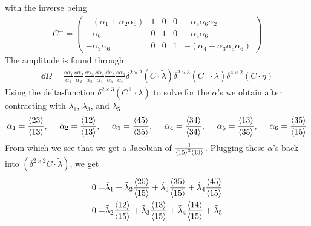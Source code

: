 \documentclass[letter,11pt]{article}
\begin{document}
with the inverse being
\begin{equation}
	\begin{aligned}
		C^\perp =\begin{pmatrix}
			-(\alpha_1+\alpha_2\alpha_6) & 1 & 0 & 0 & -\alpha_5 \alpha_6 \alpha_2\\
			-\alpha_6 & 0 & 1 & 0 & -\alpha_5 \alpha_6 \\
			-\alpha_3 \alpha_6 & 0 & 0 & 1 & -(\alpha_4+\alpha_3\alpha_5\alpha_6)
		\end{pmatrix}
	\end{aligned}
\end{equation}
The amplitude is found through
\begin{equation}
	\begin{aligned}
		\dd \Omega =\frac{\dd \alpha_1}{\alpha_1}\frac{\dd \alpha_2}{\alpha_2}\frac{\dd \alpha_3}{\alpha_3}\frac{\dd \alpha_4}{\alpha_4}\frac{\dd \alpha_5}{\alpha_5}\frac{\dd \alpha_6}{\alpha_6}\delta^{2\times 2}(C\cdot \tilde \lambda) \delta^{2\times 3}(C^\perp\cdot \lambda)\delta^{4\times 2}(C\cdot \tilde \eta)
	\end{aligned}
\end{equation}
Using the delta-function $\delta^{2\times 3}(C^\perp\cdot \lambda)$ to solve for the $\alpha$'s we obtain after contracting with $\lambda_1$, $\lambda_3$, and $\lambda_5$
\begin{equation}
	\begin{aligned}
		\alpha_1=\frac{\expval{23}}{\expval{13}},~~~~
		\alpha_2=\frac{\expval{12}}{\expval{13}},~~~~
		\alpha_3=\frac{\expval{45}}{\expval{35}},~~~~
		\alpha_4=\frac{\expval{34}}{\expval{34}},~~~~
		\alpha_5=\frac{\expval{13}}{\expval{35}},~~~~
		\alpha_6=\frac{\expval{35}}{\expval{15}}
	\end{aligned}
\end{equation}
From which we see that we get a Jacobian of $\frac{1}{\expval{15}^2\expval{13}}$. Plugging these $\alpha$'s back into $(\delta^{2\times 2}C\cdot\tilde \lambda)$, we get
\begin{equation}
	\begin{aligned}
0=&\tilde\lambda_1
+
\tilde\lambda_2 \frac{\expval{25}}{\expval{15}}
+
\tilde\lambda_3
\frac{\expval{35}}{\expval{15}}
+
\tilde\lambda_4
\frac{\expval{45}}{\expval{15}}\\
0=&\tilde\lambda_2 \frac{\expval{12}}{\expval{15}}
+
\tilde\lambda_3
\frac{\expval{13}}{\expval{15}}
+
\tilde\lambda_4 \frac{\expval{14}}{\expval{15}}
+
\tilde\lambda_5
\end{aligned}
\end{equation}
\end{document}
